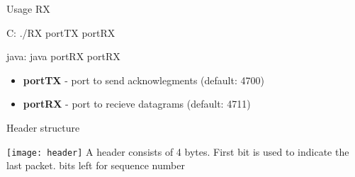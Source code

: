 \documentclass[10pt]{beamer}
\begin{document}
\begin{frame}[fragile]{Usage RX}
	\begin{block}{C:}
		\hspace*{2mm} \footnotesize ./RX portTX portRX 
	\end{block}

	\begin{block}{java:}
		\hspace*{2mm} \footnotesize java portRX portRX 
	\end{block}
		
  \begin{itemize}
  	\footnotesize 	
    \item{\textbf{portTX}} - port to send acknowlegments (default: 4700)
    \item{\textbf{portRX}} - port to recieve datagrams (default: 4711)
  \end{itemize}
\end{frame}

\begin{frame}[fragile]{Header structure}

  \texttt{[image: header]}
  \newline
  A header consists of 4 bytes. 
  \newline
  First bit is used to indicate the last packet. 
   bits left for sequence number

\end{frame}
\end{document}
